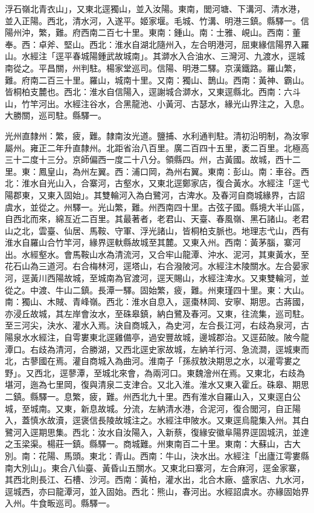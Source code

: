 \begin{pinyinscope}
浮石嶺北青衣山」，又東北逕獨山，並入汝陽。東南，閭河塘、下溝河、清水港，並入正陽。西北，清水河，入遂平。姬家堰。毛城、竹溝、明港三鎮。縣驛一。信陽州沖，繁，難。府西南二百七十里。東南：鍾山。南：士雅、峴山。西南：董奉。西：卓斧、堅山。西北：淮水自湖北隨州入，左合明港河，屈東緣信陽界入羅山。水經注「逕平春城陽鍾武故城南」。其溮水入合油水、三灣河、九渡水，逕城南從之。平昌關，州判駐。楊家堂巡司。信陽、明港二驛。京漢鐵路。羅山繁，難。府南二百三十里。羅山，城南十里。又南：獨山、鵲山。西南：黃神、霸山。皆桐柏支麓也。西北：淮水自信陽入，逕謝城合溮水，又東逕縣北。西南：六斗山，竹竿河出。水經注谷水，合黑龍池、小黃河、古瑟水，緣光山界注之，入息。大勝關，巡司駐。縣驛一。

光州直隸州：繁，疲，難。隸南汝光道。鹽捕、水利通判駐。清初沿明制，為汝寧屬州。雍正二年升直隸州。北距省治八百里。廣二百四十五里，袤二百里。北極高三十二度十三分。京師偏西一度二十八分。領縣四。州，古黃國。故城，西十二里。東：鳳皇山，為州左翼。西：浦口岡，為州右翼。東南：彭山。南：車谷。西北：淮水自光山入，合寨河，古壑水，又東北逕鄭家店，復合黃水。水經注「逕弋陽郡東，又東入固始」。其雙輪河入為白鷺河，古渒水。及春河自商城緣界，古詔虞水，並從之。州驛一。光山繁，難。州西南四十里。古弦子國。縣境大半山區，自西北而來，綿亙近二百里。其最著者，老君山、天臺、春風嶺、黑石諸山。老君山之北，雲臺、仙居、馬鞍、守軍、浮光諸山，皆桐柏支脈也。地理志弋山，西有淮水自羅山合竹竿河，緣界逕軑縣故城至其麓。又東入州。西南：黃茅腦，寨河出。水經壑水。會馬鞍山水為清流河，又合牢山龍潭、沖水、泥河，其東黃水，至花石山為三道河。右合梅林河，逕塔山，右合潑陂河。水經注木陵關水。左合晏家河，逕黃川西陽故城，至城南為官渡河，逕天賜山，水經注渒水。又東雙輪河，並從之。中渡、牛山二鎮。長潭一驛。固始繁，疲，難。州東瑾四十里。東：大山。南：獨山、木賊、青峰嶺。西北：淮水自息入，逕棗林岡、安寧、期思。古蔣國，亦浸丘故城，其左岸會汝水，至硃皋鎮，納白鷺及春河。又東，往流集，巡司駐。至三河尖，決水、灌水入焉。決自商城入，為史河，左合長江河，右歧為泉河，古陽泉水水經注，自雩婁東北逕雞備亭，過安豐故城，邊城郡治。又逕茹陂。陂今龍潭口。右歧為清河，合勝湖，又西北逕史家故城，左納羊行河、急流澗，逕城東而北，古蓼國在焉。灌自商城入為曲河。淮南子「孫叔敖決期思之水，以灌雩婁之野」。又西北，逕蓼潭，至城北來會，為兩河口。東魏澮州在焉。又東北，右歧為堪河，迤為七里岡，復與清泉二支津合。又北入淮。淮水又東入霍丘。硃皋、期思二鎮。縣驛一。息繁，疲，難。州西北九十里。西有淮水自羅山入，又東逕白公城，至城南。又東，新息故城。分流，左納清水港，合泥河，復合閭河，自正陽入，蓋慎水故瀆，逕褒信長陵故城注之。水經注申陂水。又東逕烏龍集入州。其白鷺河入逕期思集。西北：汝水自汝陽入，入新蔡，復緣安徽阜陽界逕固城汛，並達之玉梁渠。楊莊一鎮。縣驛一。商城難。州東南百二十里。東南：大蘇山，古大別。南：花陽、馬頭。東北：青山。西南：牛山，決水出。水經注「出廬江雩婁縣南大別山」。東合八仙臺、黃昏山五關水。又東北曰寨河，左合麻河，逕金家寨，其西北則長江、石槽、沙河。西南：黃柏，灌水出，北合木廠、盛家店、九水河，逕城西，亦曰龍潭河，並入固始。西北：熊山，春河出。水經詔虞水。亦緣固始界入州。牛食畈巡司。縣驛一。


\end{pinyinscope}
